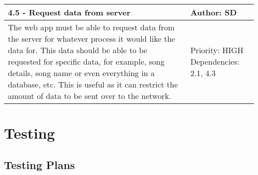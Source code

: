 \documentclass[11pt]{report}
\begin{document}
\begin{center}
\begin{longtable}{| p{13cm} | p{3cm} |}
\hline
\textbf{4.5 - Request data from server} & \textbf{Author: SD} \\
\hline
The web app must be able to request data from the server for whatever process it would like the data for. This data should be able to be requested for specific data, for example, song details, song name or even everything in a database, etc. This is useful as it can restrict the amount of data to be sent over to the network. & Priority: HIGH Dependencies: 2.1, 4.3 \\
\hline

\end{longtable}

\end{center}

\chapter{Testing}


\section{Testing Plans}
\end{document}
